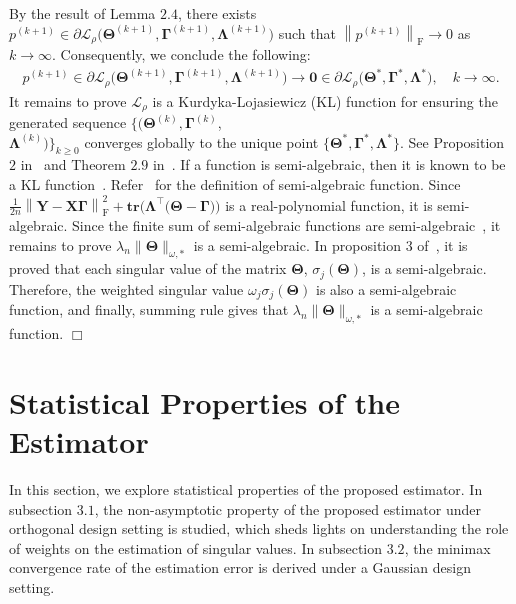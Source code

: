 \documentclass[alpha-refs]{wiley-article}
\begin{document}
By the result of Lemma $2.4$, there exists $p^{(k+1)}\in\partial \mathcal{L}_{\rho} \big( \boldsymbol{\Theta}^{(k+1)},\boldsymbol{\Gamma}^{(k+1)},\boldsymbol{\Lambda}^{(k+1)} \big)$ such that $\left\|p^{(k+1)}\right\|_{\text{F}}\rightarrow{0}$ as $k\rightarrow{\infty}$.
Consequently, we conclude the following:
\begin{align*}
    p^{(k+1)}\in\partial \mathcal{L}_{\rho} \big( \boldsymbol{\Theta}^{(k+1)},\boldsymbol{\Gamma}^{(k+1)},\boldsymbol{\Lambda}^{(k+1)} \big) \rightarrow{ \boldsymbol{0}\in\partial \mathcal{L}_{\rho} \big( \boldsymbol{\Theta}^{*},\boldsymbol{\Gamma}^{*},\boldsymbol{\Lambda}^{*} \big)}, \quad
    k\rightarrow{\infty}.
\end{align*}
It remains to prove $\mathcal{L}_{\rho}$ is a Kurdyka-Lojasiewicz (KL) function for ensuring the generated sequence
$\{(\boldsymbol{\Theta}^{(k)},\boldsymbol{\Gamma}^{(k)}$,\\
$\boldsymbol{\Lambda}^{(k)})\}_{k \geq 0}$ converges globally to the unique point
$\{\boldsymbol{\Theta}^{*},\boldsymbol{\Gamma}^{*},\boldsymbol{\Lambda}^{*}\}$.
See Proposition $2$ in~\citet{wang2019global} and Theorem $2.9$ in~\citet{attouch2013convergence}.
If a function is semi-algebraic, then it is known to be a KL function~\citep{attouch2013convergence,sun2017global}.
Refer~\citet{sun2017global} for the definition of semi-algebraic function.
Since $\frac{1}{2n}\left\| \boldsymbol{Y}-\boldsymbol{X\Gamma} \right\|_{\text{F}}^{2}+\textbf{tr}\big( \boldsymbol{\Lambda}^{\top}\big( \boldsymbol{\Theta}-\boldsymbol{\Gamma} \big)\big)$ is a real-polynomial function, it is semi-algebraic.
Since the finite sum of semi-algebraic functions are semi-algebraic~\citep{attouch2013convergence}, it remains to prove $\lambda_{n}\|\boldsymbol{\Theta}\|_{\omega,*}$ is a semi-algebraic.
In proposition $3$ of~\citet{sun2017global}, it is proved that each singular value of the matrix $\boldsymbol{\Theta}$, $\sigma_{j}(\boldsymbol{\Theta})$, is a semi-algebraic.
Therefore, the weighted singular value $\omega_{j}\sigma_{j}(\boldsymbol{\Theta})$ is also a semi-algebraic function, and finally, summing rule gives that $\lambda_{n}\|\boldsymbol{\Theta}\|_{\omega,*}$ is a semi-algebraic function.
\qquad \qquad $\Box$

\section{Statistical Properties of the Estimator}
In this section, we explore statistical properties of the proposed estimator.
In subsection $3.1$, the non-asymptotic property of the proposed estimator under orthogonal design setting is studied, which sheds lights on understanding the role of weights on the estimation of singular values.
In subsection $3.2$, the minimax convergence rate of the estimation error is derived under a Gaussian design setting.
\end{document}
